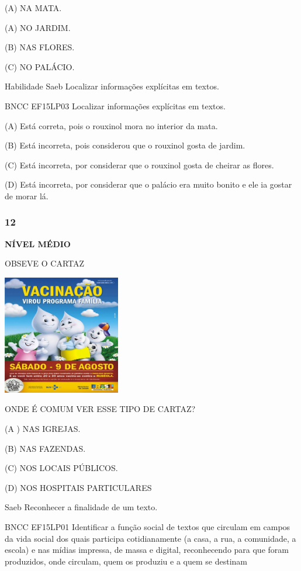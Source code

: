 (A) NA MATA.

(A) NO JARDIM.

(B) NAS FLORES.

(C) NO PALÁCIO.

Habilidade Saeb Localizar informações explícitas em textos.

BNCC EF15LP03 Localizar informações explícitas em textos.

(A) Está correta, pois o rouxinol mora no interior da mata.

(B) Está incorreta, pois considerou que o rouxinol gosta de jardim.

(C) Está incorreta, por considerar que o rouxinol gosta de cheirar as
flores.

(D) Está incorreta, por considerar que o palácio era muito bonito e ele
ia gostar de morar lá.

\subsubsection{12}\label{section-122}

\textbf{NÍVEL MÉDIO}

OBSEVE O CARTAZ

\includegraphics[width=2.01806in,height=2.05069in]{media/image159.jpeg}

ONDE É COMUM VER ESSE TIPO DE CARTAZ?

(A ) NAS IGREJAS.

(B) NAS FAZENDAS.

(C) NOS LOCAIS PÚBLICOS.

(D) NOS HOSPITAIS PARTICULARES

Saeb Reconhecer a finalidade de um texto.

BNCC EF15LP01 Identificar a função social de textos que circulam em
campos da vida social dos quais participa cotidianamente (a casa, a rua,
a comunidade, a escola) e nas mídias impressa, de massa e digital,
reconhecendo para que foram produzidos, onde circulam, quem os produziu
e a quem se destinam

